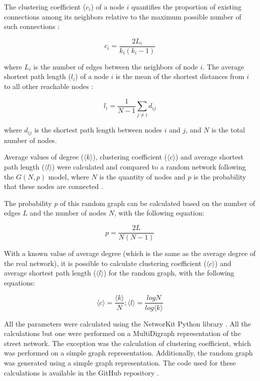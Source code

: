 \documentclass{pssbmac}
\begin{document}
The clustering coefficient ($c_i$) of a node $i$ quantifies the proportion of existing connections among its neighbors relative to the maximum possible number of such connections \cite{costaCharacterizationComplexNetworks2007}:

\begin{equation}
c_i = \frac{2 L_i}{k_i (k_i - 1)} \label{eq:ci}
\end{equation}

where $L_i$ is the number of edges between the neighbors of node $i$. The average shortest path length ($l_i$) of a node $i$ is the mean of the shortest distances from $i$ to all other reachable nodes \cite{costaCharacterizationComplexNetworks2007}:

\begin{equation}
l_i = \frac{1}{N - 1} \sum_{j \neq i} d_{ij} \label{eq:li}
\end{equation}

where $d_{ij}$ is the shortest path length between nodes $i$ and $j$, and $N$ is the total number of nodes.

Average values of degree ($\langle k \rangle$), clustering coefficient ($\langle c \rangle$) and average shortest path length ($\langle l \rangle$) were calculated and compared to a random network following the $G(N, p)$ model, where $N$ is the quantity of nodes and $p$ is the probability that these nodes are connected \cite{barabasiNetworkScience2016}.

The probability $p$ of this random graph can be calculated based on the number of edges $L$ and the number of nodes $N$, with the following equation:

\begin{equation}
p = \frac{2L}{N(N-1)}
\end{equation}

With a known value of average degree (which is the same as the average degree of the real network), it is possible to calculate clustering coefficient ($\langle c \rangle$) and average shortest path length ($\langle l \rangle$) for the random graph, with the following equations:

\begin{equation}
\langle c \rangle = \frac{\langle k \rangle}{N}; \langle l \rangle = \frac{logN}{log\langle k \rangle}
\end{equation}

All the parameters were calculated using the NetworKit Python library \cite{Angriman2022}. All the calculations but one were performed on a MultiDigraph representation of the street network. The exception was the calculation of clustering coefficient, which was performed on a simple graph representation. Additionally, the random graph was generated using a simple graph representation. The code used for these calculations is available in the GitHub repository \cite{santosSpNetwork2026}.
\end{document}
